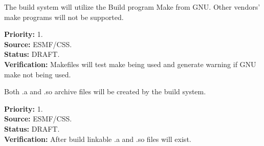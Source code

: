 

The build system will utilize the Build program Make from
GNU.  Other vendors' make programs will not be supported.
\begin{reqlist}
{\bf Priority:} 1. \\
{\bf Source:} ESMF/CSS. \\
{\bf Status:} DRAFT. \\
{\bf Verification:} Makefiles will test make being used and generate
warning if GNU make not being used.
\end{reqlist}

Both .a and .so archive files will be created by the 
build system.
\begin{reqlist}
{\bf Priority:} 1. \\
{\bf Source:} ESMF/CSS. \\
{\bf Status:} DRAFT. \\
{\bf Verification:} After build linkable .a and .so files will exist.
\end{reqlist}

